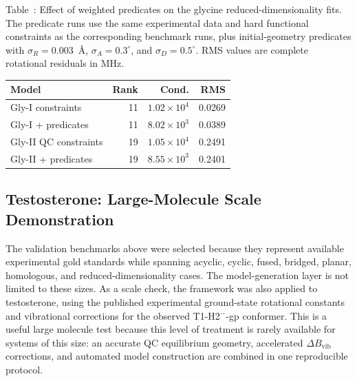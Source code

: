 \documentclass[aip,jcp,reprint,longbibliography,floatfix]{revtex4-2}
\begin{document}
\begin{center}
\label{tab:glycine-predicate-checks}
\parbox{0.94\linewidth}{\small\raggedright Table~\thetable: Effect of weighted
predicates on the glycine reduced-dimensionality fits. The predicate runs use
the same experimental data and hard functional constraints as the corresponding
benchmark runs, plus initial-geometry predicates with $\sigma_R=0.003$~\AA{},
$\sigma_A=0.3^\circ$, and $\sigma_D=0.5^\circ$. RMS values are complete
rotational residuals in MHz.\par}
\smallskip
\small
\setlength{\tabcolsep}{3pt}
\begin{tabular}{lrrr}
\toprule
Model & Rank & Cond. & RMS \\
\midrule
Gly-I constraints & 11 & $1.02\times10^4$ & 0.0269 \\
Gly-I + predicates & 11 & $8.02\times10^3$ & 0.0389 \\
Gly-II QC constraints & 19 & $1.05\times10^4$ & 0.2491 \\
Gly-II + predicates & 19 & $8.55\times10^3$ & 0.2401 \\
\bottomrule
\end{tabular}
\end{center}

\subsection{Testosterone: Large-Molecule Scale Demonstration}

The validation benchmarks above were selected because they represent available
experimental gold standards while spanning acyclic, cyclic, fused, bridged,
planar, homologous, and reduced-dimensionality cases. The model-generation
layer is not limited to these sizes. As a scale check, the framework was
also applied to testosterone, using the published experimental ground-state
rotational constants and vibrational corrections for the observed
T1-H2$^{-}$-gp conformer.\cite{Uribe2024SteroidHormones} This is a useful large
molecule test because this level of treatment is rarely available for systems
of this size: an accurate QC equilibrium geometry, accelerated
$\Delta B_\mathrm{vib}$ corrections, and automated model construction are
combined in one reproducible protocol.
\end{document}
